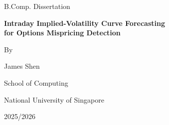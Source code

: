 \documentclass[12pt]{report}
\begin{document}
\hypersetup{pageanchor=false}

\begin{titlepage}
\thispagestyle{empty}
\centering

\vspace*{2.2cm}

{\Large B.Comp. Dissertation\par}
\vspace{1.6cm}

{\Huge\bfseries Intraday Implied-Volatility Curve Forecasting\\[0.25em]
for Options Mispricing Detection\\[0.25em]\par}

\vspace{1.8cm}

{\Large By\par}
\vspace{0.4cm}
{\Large James Shen\par}

\vfill

{\large School of Computing\par}
{\large National University of Singapore\par}

\vspace{1.2cm}

{\large 2025/2026\par}

\end{titlepage}
\end{document}
